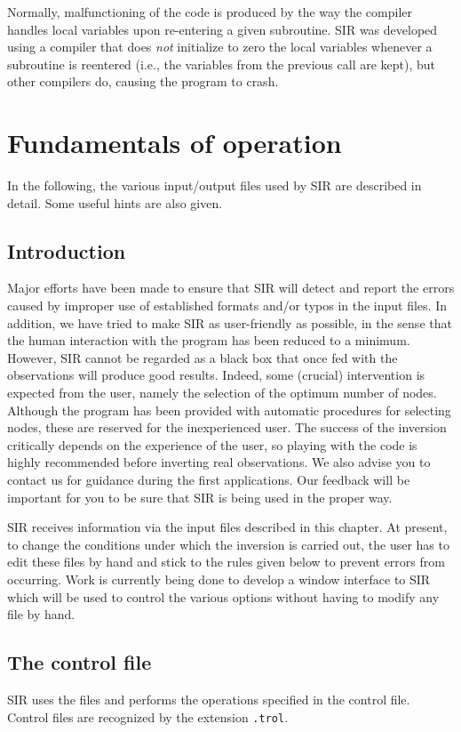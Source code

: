 \documentclass[11pt]{report}
\begin{document}
Normally, malfunctioning of the code is produced by the way the
compiler handles local variables upon re-entering a given subroutine.
SIR was developed using a compiler that does {\em not} initialize to
zero the local variables whenever a subroutine is reentered (i.e., the
variables from the previous call are kept), but other compilers do,
causing the program to crash.



\chapter{Fundamentals of operation}
In the following, the various input/output files used by SIR are 
described in detail. Some useful hints are also given.  

\section{Introduction}
Major efforts have been made to ensure that SIR will detect and report
the errors caused by improper use of established formats and/or typos
in the input files. In addition, we have tried to make SIR as
user-friendly as possible, in the sense that the human interaction with
the program has been reduced to a minimum.  However, SIR cannot be
regarded as a black box that once fed with the observations will
produce good results. Indeed, some (crucial) intervention is
expected from the user, namely the selection of the optimum number of
nodes. Although the program has been provided with automatic procedures
for selecting nodes, these are reserved for the inexperienced user. The
success of the inversion critically depends on the experience of the
user, so playing with the code is highly recommended before inverting
real observations. We also advise you to contact us for guidance during 
the first applications. Our feedback will be important for you to be 
sure that SIR is being used in the proper way.  

SIR receives information via the input files described in this chapter.
At present, to change the conditions under which the inversion is
carried out, the user has to edit these files by hand and stick to the
rules given below to prevent errors from occurring. Work is currently
being done to develop a window interface to SIR which will be
used to control the various options without having to modify any file
by hand.    

\section{The control file}
SIR uses the files and performs the operations specified in the 
control file. Control files are recognized by the extension {\tt .trol}. 
 
\end{document}
